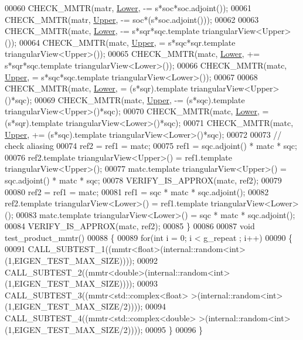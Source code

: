 \begin{DoxyCode}
00060   CHECK\_MMTR(matr, \hyperlink{group__enums_gga39e3366ff5554d731e7dc8bb642f83cda891792b8ed394f7607ab16dd716f60e6}{Lower}, -= s*soc*soc.adjoint());
00061   CHECK\_MMTR(matr, \hyperlink{group__enums_gga39e3366ff5554d731e7dc8bb642f83cda6bcb58be3b8b8ec84859ce0c5ac0aaec}{Upper}, -= soc*(s*soc.adjoint()));
00062   
00063   CHECK\_MMTR(matc, \hyperlink{group__enums_gga39e3366ff5554d731e7dc8bb642f83cda891792b8ed394f7607ab16dd716f60e6}{Lower}, -= s*sqr*sqc.template triangularView<Upper>());
00064   CHECK\_MMTR(matc, \hyperlink{group__enums_gga39e3366ff5554d731e7dc8bb642f83cda6bcb58be3b8b8ec84859ce0c5ac0aaec}{Upper}, = s*sqc*sqr.template triangularView<Upper>());
00065   CHECK\_MMTR(matc, \hyperlink{group__enums_gga39e3366ff5554d731e7dc8bb642f83cda891792b8ed394f7607ab16dd716f60e6}{Lower}, += s*sqr*sqc.template triangularView<Lower>());
00066   CHECK\_MMTR(matc, \hyperlink{group__enums_gga39e3366ff5554d731e7dc8bb642f83cda6bcb58be3b8b8ec84859ce0c5ac0aaec}{Upper}, = s*sqc*sqc.template triangularView<Lower>());
00067   
00068   CHECK\_MMTR(matc, \hyperlink{group__enums_gga39e3366ff5554d731e7dc8bb642f83cda891792b8ed394f7607ab16dd716f60e6}{Lower}, = (s*sqr).\textcolor{keyword}{template} triangularView<Upper>()*sqc);
00069   CHECK\_MMTR(matc, \hyperlink{group__enums_gga39e3366ff5554d731e7dc8bb642f83cda6bcb58be3b8b8ec84859ce0c5ac0aaec}{Upper}, -= (s*sqc).\textcolor{keyword}{template} triangularView<Upper>()*sqc);
00070   CHECK\_MMTR(matc, \hyperlink{group__enums_gga39e3366ff5554d731e7dc8bb642f83cda891792b8ed394f7607ab16dd716f60e6}{Lower}, = (s*sqr).\textcolor{keyword}{template} triangularView<Lower>()*sqc);
00071   CHECK\_MMTR(matc, \hyperlink{group__enums_gga39e3366ff5554d731e7dc8bb642f83cda6bcb58be3b8b8ec84859ce0c5ac0aaec}{Upper}, += (s*sqc).\textcolor{keyword}{template} triangularView<Lower>()*sqc);
00072 
00073   \textcolor{comment}{// check aliasing}
00074   ref2 = ref1 = matc;
00075   ref1 = sqc.adjoint() * matc * sqc;
00076   ref2.template triangularView<Upper>() = ref1.template triangularView<Upper>();
00077   matc.template triangularView<Upper>() = sqc.adjoint() * matc * sqc;
00078   VERIFY\_IS\_APPROX(matc, ref2);
00079 
00080   ref2 = ref1 = matc;
00081   ref1 = sqc * matc * sqc.adjoint();
00082   ref2.template triangularView<Lower>() = ref1.template triangularView<Lower>();
00083   matc.template triangularView<Lower>() = sqc * matc * sqc.adjoint();
00084   VERIFY\_IS\_APPROX(matc, ref2);
00085 \}
00086 
00087 \textcolor{keywordtype}{void} test\_product\_mmtr()
00088 \{
00089   \textcolor{keywordflow}{for}(\textcolor{keywordtype}{int} i = 0; i < g\_repeat ; i++)
00090   \{
00091     CALL\_SUBTEST\_1((mmtr<float>(internal::random<int>(1,EIGEN\_TEST\_MAX\_SIZE))));
00092     CALL\_SUBTEST\_2((mmtr<double>(internal::random<int>(1,EIGEN\_TEST\_MAX\_SIZE))));
00093     CALL\_SUBTEST\_3((mmtr<std::complex<float> >(internal::random<int>(1,EIGEN\_TEST\_MAX\_SIZE/2))));
00094     CALL\_SUBTEST\_4((mmtr<std::complex<double> >(internal::random<int>(1,EIGEN\_TEST\_MAX\_SIZE/2))));
00095   \}
00096 \}
\end{DoxyCode}
